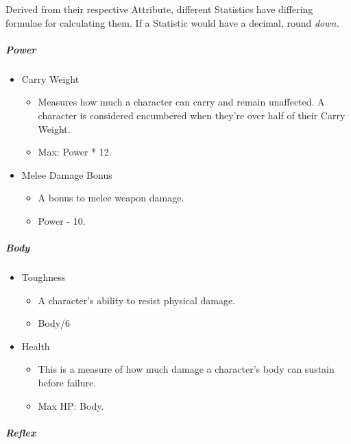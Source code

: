 \documentclass[
]{article}
\providecommand{\tightlist}{%
  \setlength{\itemsep}{0pt}\setlength{\parskip}{0pt}}
\begin{document}
Derived from their respective Attribute, different Statistics have
differing formulae for calculating them. If a Statistic would have a
decimal, round \emph{down.}

\hypertarget{power-1}{%
\subparagraph{Power}\label{power-1}}

\begin{itemize}
\tightlist
\item
  Carry Weight

  \begin{itemize}
  \tightlist
  \item
    Measures how much a character can carry and remain unaffected. A
    character is considered encumbered when they're over half of their
    Carry Weight.
  \item
    Max: Power * 12.
  \end{itemize}
\item
  Melee Damage Bonus

  \begin{itemize}
  \tightlist
  \item
    A bonus to melee weapon damage.
  \item
    Power - 10.
  \end{itemize}
\end{itemize}

\hypertarget{body-1}{%
\subparagraph{Body}\label{body-1}}

\begin{itemize}
\tightlist
\item
  Toughness

  \begin{itemize}
  \tightlist
  \item
    A character's ability to resist physical damage.
  \item
    Body/6
  \end{itemize}
\item
  Health

  \begin{itemize}
  \tightlist
  \item
    This is a measure of how much damage a character's body can sustain
    before failure.
  \item
    Max HP: Body.
  \end{itemize}
\end{itemize}

\hypertarget{reflex-1}{%
\subparagraph{Reflex}\label{reflex-1}}
\end{document}
